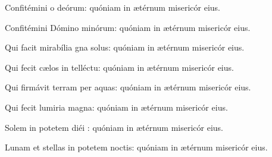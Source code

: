 \item {}

\item Confitémini o deórum:\psstar{} quóniam in ætérnum misericór eius.

\item Confitémini Dómino minórum:\psstar{} quóniam in ætérnum misericór eius.

\item Qui facit mirabília gna solus:\psstar{} quóniam in ætérnum misericór eius.

\item Qui fecit cælos in telléctu:\psstar{} quóniam in ætérnum misericór eius.

\item Qui firmávit terram per aquas:\psstar{} quóniam in ætérnum misericór eius.

\item Qui fecit lumiria magna:\psstar{} quóniam in ætérnum misericór eius.

\item Solem in potetem diéi :\psstar{} quóniam in ætérnum misericór eius.

\item Lunam et stellas in potetem noctis:\psstar{} quóniam in ætérnum misericór eius.
